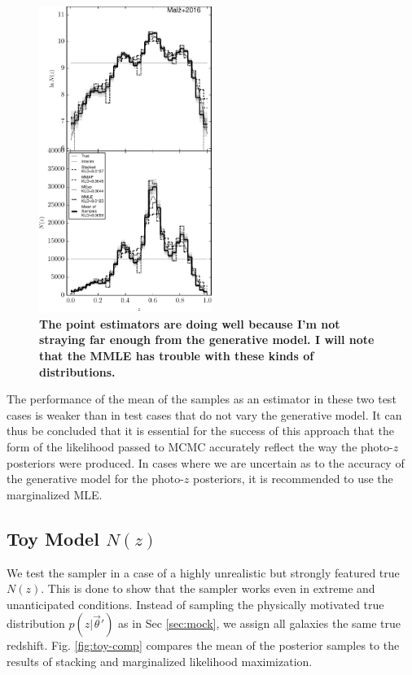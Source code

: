 \documentclass[preprint]{aastex}
\begin{document}
\begin{figure}
\includegraphics[width=0.5\textwidth]{figs/mult/comps.pdf}
\caption{\textbf{The point estimators are doing well because I'm not straying 
far enough from the generative model.  I will note that the MMLE has trouble 
with these kinds of distributions.}}
\label{fig:multi-comp}
\end{figure}

The performance of the mean of the samples as an estimator in these two test 
cases is weaker than in test cases that do not vary the generative model.  It 
can thus be concluded that it is essential for the success of this approach 
that the form of the likelihood passed to MCMC accurately reflect the way the 
photo-$z$ posteriors were produced.  In cases where we are uncertain as to the 
accuracy of the generative model for the photo-$z$ posteriors, it is 
recommended to use the marginalized MLE.

\clearpage
\subsection{Toy Model $N(z)$}
\label{sec:fake}

We test the sampler in a case of a highly unrealistic but strongly featured 
true $N(z)$.  This is done to show that the sampler works even in extreme and 
unanticipated conditions.  Instead of sampling the physically motivated true 
distribution $p(z|\vec{\theta}')$ as in Sec \ref{sec:mock}, we assign all 
galaxies the same true redshift.  Fig. \ref{fig:toy-comp} compares the mean of 
the posterior samples to the results of stacking and marginalized likelihood 
maximization.    
\end{document}
